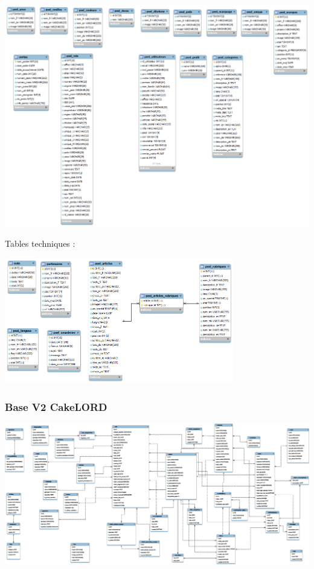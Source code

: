 ﻿\documentclass[a4paper,10pt]{article}
\begin{document}
\begin{center}\includegraphics[width=\textwidth]{LORDv1_Tables_fonctionnelles.png}\end{center}

Tables techniques :

\begin{center}\includegraphics[width=0.75\textwidth]{LORDv1_Tables_techniques.png}\end{center}


\begin{landscape}
\subsubsection{Base V2 CakeLORD}
\label{app:dbv2}
\noindent\includegraphics[width=\linewidth]{cakelord.eps}
\end{landscape}
\end{document}
